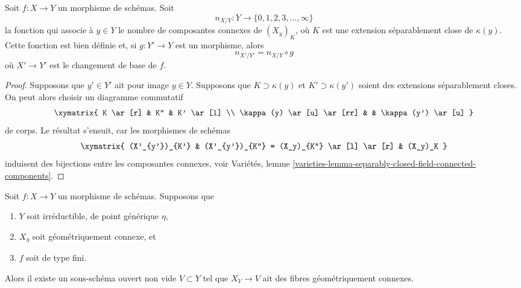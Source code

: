 \begin{lemma}
\label{lemma-base-change-fibres-nr-geometrically-connected-components}
Soit $f : X \to Y$ un morphisme de schémas. Soit
$$
n_{X/Y} : Y \to \{0, 1, 2, 3, \ldots, \infty\}
$$
la fonction qui associe à $y \in Y$ le nombre de composantes connexes
de $(X_y)_K$, où $K$ est une extension séparablement close
de $\kappa(y)$. Cette fonction est bien définie et, si $g : Y' \to Y$ est un morphisme,
alors
$$
n_{X'/Y'} = n_{X/Y} \circ g
$$
où $X' \to Y'$ est le changement de base de $f$.
\end{lemma}

\begin{proof}
Supposons que $y' \in Y'$ ait pour image $y \in Y$.
Supposons que $K \supset \kappa(y)$ et $K' \supset \kappa(y')$ soient des extensions
séparablement closes. On peut alors choisir un diagramme commutatif
$$
\xymatrix{
K \ar[r] & K'' & K' \ar[l] \\
\kappa(y) \ar[u] \ar[rr] & & \kappa(y') \ar[u]
}
$$
de corps. Le résultat s'ensuit, car les morphismes de schémas
$$
\xymatrix{
(X'_{y'})_{K'} &
(X'_{y'})_{K''} = (X_y)_{K''} \ar[l] \ar[r] &
(X_y)_K
}
$$
induisent des bijections entre les composantes connexes, voir
Variétés,
lemme \ref{varieties-lemma-separably-closed-field-connected-components}.
\end{proof}

\begin{lemma}
\label{lemma-geometrically-connected-generic-fibre}
Soit $f : X \to Y$ un morphisme de schémas.
Supposons que
\begin{enumerate}
\item $Y$ soit irréductible, de point générique $\eta$,
\item $X_\eta$ soit géométriquement connexe, et
\item $f$ soit de type fini.
\end{enumerate}
Alors il existe un sous-schéma ouvert non vide $V \subset Y$
tel que $X_V \to V$ ait des fibres géométriquement connexes.
\end{lemma}

